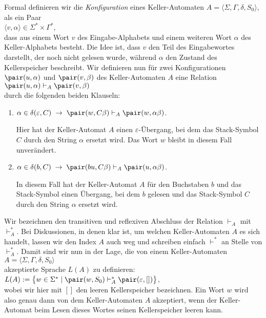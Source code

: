 Formal definieren wir die \emph{Konfiguration} eines Keller-Automaten $A = \langle \Sigma, \Gamma, \delta, S_0 \rangle$,
als ein Paar
\\[0.2cm]
\hspace*{1.3cm}
$\langle v, \alpha \rangle \in \Sigma^* \times \Gamma^*$,
\\[0.2cm]
dass aus einem Wort $v$ des Eingabe-Alphabets und einem weiteren Wort
$\alpha$  des Keller-Alphabets besteht.  Die Idee ist, dass $v$ den Teil des Eingabewortes
darstellt, der noch nicht gelesen wurde, w\"ahrend $\alpha$ den Zustand des Kellerspeicher  beschreibt. 
Wir definieren nun f\"ur zwei Konfigurationen $\pair(u,\alpha)$ und $\pair(v,\beta)$ des
Keller-Automaten $A$ eine
Relation 
\\[0.2cm]
\hspace*{1.3cm}
$\pair(u,\alpha) \vdash_A \pair(v,\beta)$
\\[0.2cm]
durch die folgenden beiden Klauseln:
\begin{enumerate}
\item $\alpha \in \delta(\varepsilon, C) \;\rightarrow\; \pair(w, C\beta) \vdash_A \pair(w,\alpha \beta)$.

      Hier hat der Keller-Automat $A$ einen $\varepsilon$-\"Ubergang,
      bei dem das Stack-Symbol $C$ durch den String $\alpha$ ersetzt wird.
      Das Wort $w$ bleibt in diesem Fall unver\"andert.
      
\item $\alpha \in \delta(b, C) \;\rightarrow\; \pair(bu, C\beta) \vdash_A \pair(u,\alpha \beta)$.

      In diesem Fall hat der Keller-Automat $A$ f\"ur den Buchstaben $b$ und das
      Stack-Symbol einen \"Ubergang, bei dem $b$ gelesen und das Stack-Symbol $C$ durch
      den String $\alpha$ ersetzt wird. 
\end{enumerate}
Wir bezeichnen den transitiven und reflexiven Abschluss der Relation $\vdash_A$ mit
$\vdash_A^*$.  Bei Diskussionen, in denen klar ist, um welchen Keller-Automaten $A$ es
sich handelt, lassen wir den Index $A$ auch weg und schreiben einfach $\vdash^*$ an Stelle
von $\vdash_A^*$.  Damit sind wir nun in der Lage, die von einem Keller-Automaten 
\\[0.2cm]
\hspace*{1.3cm}
$A = \langle \Sigma, \Gamma, \delta, S_0 \rangle$
\\[0.2cm]
akzeptierte Sprache $L(A)$ zu definieren:
\\[0.2cm]
\hspace*{1.3cm}
$L(A) := \bigl\{ w \in \Sigma^* \mid \pair(w,S_0) \vdash_A^* \pair(\varepsilon, []) \bigr\}$,
\\[0.2cm]
wobei wir hier mit $[]$ den leeren Kellerspeicher bezeichnen.  Ein Wort $w$ wird also genau dann
von dem Keller-Automaten $A$ akzeptiert,  wenn der Keller-Automat beim Lesen dieses Wortes
seinen Kellerspeicher leeren kann.

